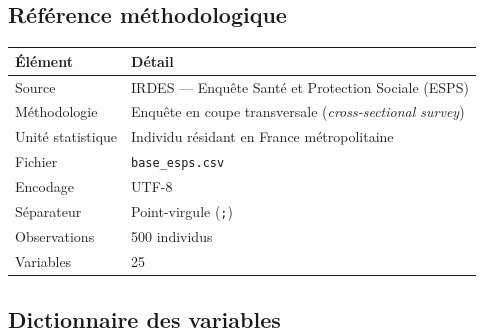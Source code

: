 \documentclass[11pt,a4paper]{memoirerecherche}
\begin{document}
\hypertarget{ruxe9fuxe9rence-muxe9thodologique}{%
\subsection*{Référence méthodologique}\label{ruxe9fuxe9rence-muxe9thodologique}}

\begin{tabular}{@{} l p{10cm} @{}}
\toprule
\textbf{Élément} & \textbf{Détail} \\
\midrule
Source & IRDES --- Enquête Santé et Protection Sociale (ESPS) \\
Méthodologie & Enquête en coupe transversale (\textit{cross-sectional survey}) \\
Unité statistique & Individu résidant en France métropolitaine \\
Fichier & \texttt{base\_esps.csv} \\
Encodage & UTF-8 \\
Séparateur & Point-virgule (\texttt{;}) \\
Observations & 500 individus \\
Variables & 25 \\
\bottomrule
\end{tabular}

\medskip

\hypertarget{dictionnaire-des-variables}{%
\subsection*{Dictionnaire des variables}\label{dictionnaire-des-variables}}
\end{document}
